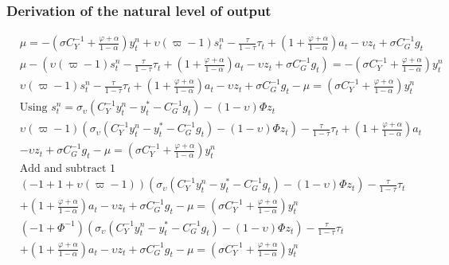 \subsubsection*{Derivation of the natural level of output}
\begin{align} \label{eq:appendix_natural_level_of_output_beginning}
    &\mu = -\left(\sigma C_Y^{-1} + \frac{\varphi + \alpha}{1-\alpha}\right)y^n_t + \upsilon (\varpi - 1) s^n_t - \frac{\tau}{1-\tau}\tau_t  + \left(1 + \frac{\varphi + \alpha}{1-\alpha}\right)a_t - \upsilon z_t + \sigma C_G^{-1} g_t\\
    &\mu - \left( \upsilon (\varpi - 1) s^n_t - \frac{\tau}{1-\tau}\tau_t  + \left(1 + \frac{\varphi + \alpha}{1-\alpha}\right)a_t - \upsilon z_t + \sigma C_G^{-1} g_t \right) = -\left(\sigma C_Y^{-1} + \frac{\varphi + \alpha}{1-\alpha}\right)y^n_t\\
    &\upsilon (\varpi - 1) s^n_t - \frac{\tau}{1-\tau}\tau_t  + \left(1 + \frac{\varphi + \alpha}{1-\alpha}\right)a_t - \upsilon z_t + \sigma C_G^{-1} g_t-\mu = \left(\sigma C_Y^{-1} + \frac{\varphi + \alpha}{1-\alpha}\right)y^n_t\\
    &\text{Using $s^n_t = \sigma_\upsilon(C_Y^{-1} y^n_t - y^*_t - C_G^{-1} g_t) - (1-\upsilon)\Phi z_t$} \nonumber\\
    &\upsilon (\varpi - 1) (\sigma_\upsilon(C_Y^{-1} y^n_t - y^*_t - C_G^{-1} g_t) - (1-\upsilon)\Phi z_t) - \frac{\tau}{1-\tau}\tau_t  + \left(1 + \frac{\varphi + \alpha}{1-\alpha}\right)a_t \nonumber \\ 
        &- \upsilon z_t + \sigma C_G^{-1} g_t-\mu = \left(\sigma C_Y^{-1} + \frac{\varphi + \alpha}{1-\alpha}\right)y^n_t\\
    &\text{Add and subtract 1} \nonumber \\
    &(- 1 + 1 + \upsilon (\varpi - 1)) (\sigma_\upsilon(C_Y^{-1} y^n_t - y^*_t - C_G^{-1} g_t) - (1-\upsilon)\Phi z_t) - \frac{\tau}{1-\tau}\tau_t  \nonumber \\ 
        &+ \left(1 + \frac{\varphi + \alpha}{1-\alpha}\right)a_t - \upsilon z_t + \sigma C_G^{-1} g_t-\mu = \left(\sigma C_Y^{-1} + \frac{\varphi + \alpha}{1-\alpha}\right)y^n_t\\
    &(- 1 + \Phi^{-1}) (\sigma_\upsilon(C_Y^{-1} y^n_t - y^*_t - C_G^{-1} g_t) - (1-\upsilon)\Phi z_t) - \frac{\tau}{1-\tau}\tau_t  \nonumber \\
        &+ \left(1 + \frac{\varphi + \alpha}{1-\alpha}\right)a_t - \upsilon z_t + \sigma C_G^{-1} g_t-\mu = \left(\sigma C_Y^{-1} + \frac{\varphi + \alpha}{1-\alpha}\right)y^n_t\\

\end{align}
